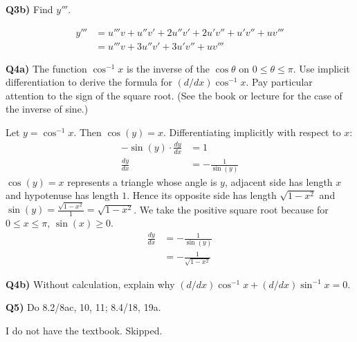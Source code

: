 \documentclass[9pt]{article}
\begin{document}
\begin{tcolorbox}
  \textbf{Q3b)} Find $y'''$.
\end{tcolorbox}
\begin{align*}
  y''' &= u'''v + u''v' + 2u''v' + 2u'v'' + u'v'' + uv'''\\
       &= u'''v + 3u''v' + 3u'v'' + uv'''
\end{align*}


\begin{tcolorbox}
  \textbf{Q4a)} The function $\cos^{-1}x$ is the inverse of the $\cos\theta$ on $0 \leq \theta \leq \pi$. Use implicit differentiation to derive the formula for $(d/dx)\cos^{-1}x$. Pay particular attention to the sign of the square root. (See the book or lecture for the case of the inverse of sine.)
\end{tcolorbox}

Let $y = \cos^{-1}x$. Then $\cos(y) = x$. Differentiating implicitly with respect to $x$:
\begin{align*}
  -\sin(y) \cdot \frac{dy}{dx} &= 1\\
  \frac{dy}{dx} &= -\frac{1}{\sin(y)}
\end{align*}
$\cos(y) = x$ represents a triangle whose angle is $y$, adjacent side has length $x$ and hypotenuse has length $1$. Hence its opposite side has length $\sqrt{1 - x^2}$ and $\sin(y) = \frac{\sqrt{1 - x^2}}{1} = \sqrt{1 - x^2}$. We take the positive square root because for $0 \leq x \leq \pi$, $\sin(x) \geq 0$.
\begin{align*}
  \frac{dy}{dx} &= -\frac{1}{\sin(y)}\\
                &= -\frac{1}{\sqrt{1 - x^2}}
\end{align*}


\begin{tcolorbox}
  \textbf{Q4b)} Without calculation, explain why $(d/dx)\cos^{-1}x + (d/dx)\sin^{-1}x = 0$.
\end{tcolorbox}


\begin{tcolorbox}
  \textbf{Q5)} Do 8.2/8ac, 10, 11; 8.4/18, 19a.
\end{tcolorbox}

I do not have the textbook. Skipped.
\end{document}

